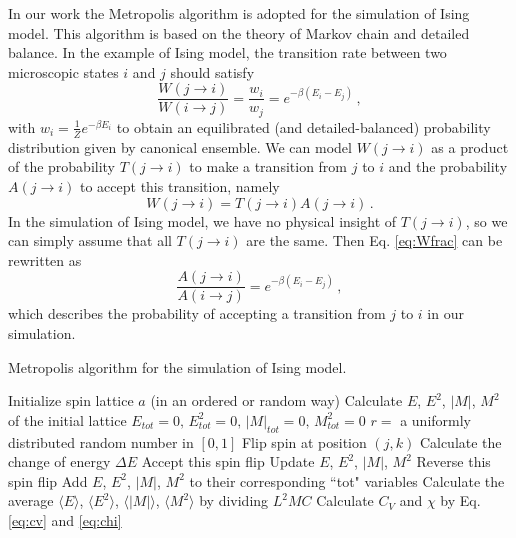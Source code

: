 In our work the Metropolis algorithm is adopted for the simulation of Ising model. 
This algorithm is based on the theory of Markov chain and detailed balance. 
In the example of Ising model, the transition rate between two microscopic states $i$ and $j$ should satisfy 
\begin{equation}\label{eq:Wfrac}
\frac{W(j \rightarrow i)}{W(i \rightarrow j)}=\frac{w_i}{w_j}=e^{-\beta\left(E_i-E_j\right)}\,,
\end{equation}
with $w_i=\frac{1}{Z}e^{-\beta E_i}$ 
to obtain an equilibrated (and detailed-balanced) probability distribution given by canonical ensemble. 
We can model $W(j \rightarrow i)$ as a product of the probability $T(j \rightarrow i)$ to make a transition from $j$ to $i$ 
and the probability $A(j \rightarrow i)$ to accept this transition, namely 
\begin{equation}
W(j \rightarrow i)=T(j \rightarrow i)A(j \rightarrow i)\,.
\end{equation}
In the simulation of Ising model, we have no physical insight of $T(j \rightarrow i)$, 
so we can simply assume that all $T(j \rightarrow i)$ are the same. 
Then Eq. \ref{eq:Wfrac} can be rewritten as 
\begin{equation}\label{eq:Afrac}
\frac{A(j \rightarrow i)}{A(i \rightarrow j)}=e^{-\beta\left(E_i-E_j\right)}\,,
\end{equation}
which describes the probability of accepting a transition from $j$ to $i$ in our simulation. 
\par
\begin{algorithm}[tb]
	\caption{Metropolis algorithm for the simulation of Ising model. }
	\label{alg::metropolis}
	Initialize spin lattice $a$ (in an ordered or random way)\;
	Calculate $E$, $E^2$, $|M|$, $M^2$ of the initial lattice\; 
	$E_{tot}=0,\,E^2_{tot}=0,\,|M|_{tot}=0,\,M^2_{tot}=0$\;
	{
		{
			{
				$r=$ a uniformly distributed random number in $[0,1]$\;
				Flip spin at position $(j,k)$\;
				Calculate the change of energy $\Delta E$\; 
				{
					Accept this spin flip\; 
					Update $E$, $E^2$, $|M|$, $M^2$\;
				}
				\Else
				{
					Reverse this spin flip\;
				}
			Add $E$, $E^2$, $|M|$, $M^2$ to their corresponding ``tot" variables\; 
			}
		}
	}
	Calculate the average $\langle E \rangle$, $\langle E^2 \rangle$, $\langle |M| \rangle$, $\langle M^2 \rangle$ by dividing $L^2MC$\; 
	Calculate $C_V$ and $\chi$ by Eq. \ref{eq:cv} and \ref{eq:chi}\;
\end{algorithm}
